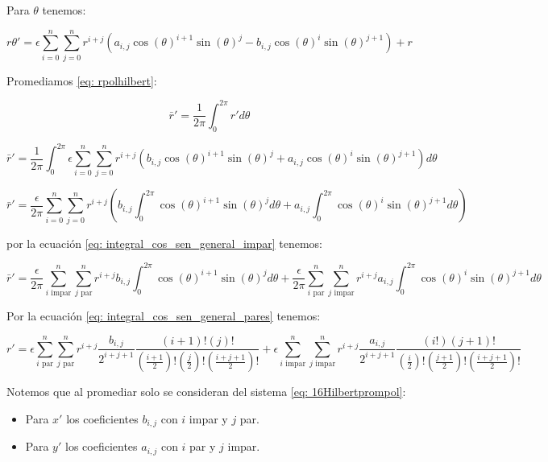 Para $\theta$ tenemos:

\begin{equation}\label{eq: thetapolhilbert}
	r\theta'=\epsilon\sum_{i=0}^{n}\sum_{j=0}^{n}r^{i+j}(a_{i,j}\cos(\theta)^{i+1}\sin(\theta)^j-b_{i,j}\cos(\theta)^{i}\sin(\theta)^{j+1})+r
\end{equation}

Promediamos \eqref{eq: rpolhilbert}:

\[
\bar{r}'=\frac{1}{2\pi}\int_{0}^{2\pi}r'd\theta
\]

\[
\bar{r}'=\frac{1}{2\pi}\int_{0}^{2\pi}\epsilon\sum_{i=0}^{n}\sum_{j=0}^{n}r^{i+j}(b_{i,j}\cos(\theta)^{i+1}\sin(\theta)^j+a_{i,j}\cos(\theta)^i\sin(\theta)^{j+1})d\theta
\]

\[
\bar{r}'=\frac{\epsilon}{2\pi}\sum_{i=0}^{n}\sum_{j=0}^{n}r^{i+j}\left(b_{i,j}\int_{0}^{2\pi}\cos(\theta)^{i+1}\sin(\theta)^j d\theta+a_{i,j}\int_{0}^{2\pi}\cos(\theta)^i\sin(\theta)^{j+1} d\theta\right)
\]

por la ecuación \eqref{eq: integral_cos_sen_general_impar} tenemos:

\[
\bar{r}'=\frac{\epsilon}{2\pi}\sum_{i \text{ impar}}^{n}\sum_{j \text{ par}}^{n}r^{i+j}b_{i,j}\int_{0}^{2\pi}\cos(\theta)^{i+1}\sin(\theta)^j d\theta+\frac{\epsilon}{2\pi}\sum_{i \text{ par}}^{n}\sum_{j \text{ impar}}^{n}r^{i+j}a_{i,j}\int_{0}^{2\pi}\cos(\theta)^i\sin(\theta)^{j+1} d\theta
\]

Por la ecuación \eqref{eq: integral_cos_sen_general_pares} tenemos:

\begin{equation}\label{r_promedio}
	r'=\epsilon\sum_{i \text{ par}}^{n}\sum_{j \text{ par}}^{n}r^{i+j}\frac{b_{i,j}}{2^{i+j+1}}\frac{\left(i+1\right)!\left(j\right)!}{\left(\frac{i+1}{2}\right)!\left(\frac{j}{2}\right)!\left(\frac{i+j+1}{2}\right)!}+\epsilon\sum_{i \text{ impar}}^{n}\sum_{j \text{ impar}}^{n}r^{i+j}\frac{a_{i,j}}{2^{i+j+1}}\frac{\left(i!\right)\left(j+1\right)!}{\left(\frac{i}{2}\right)!\left(\frac{j+1}{2}\right)!\left(\frac{i+j+1}{2}\right)!}
\end{equation}

Notemos que al promediar solo se consideran del sistema \eqref{eq: 16Hilbertprompol}:
\begin{itemize}
	\item Para $x'$ los coeficientes $b_{i,j}$ con $i$ impar y $j$ par.
	\item Para $y'$ los coeficientes $a_{i,j}$ con $i$ par y $j$ impar.
\end{itemize}






